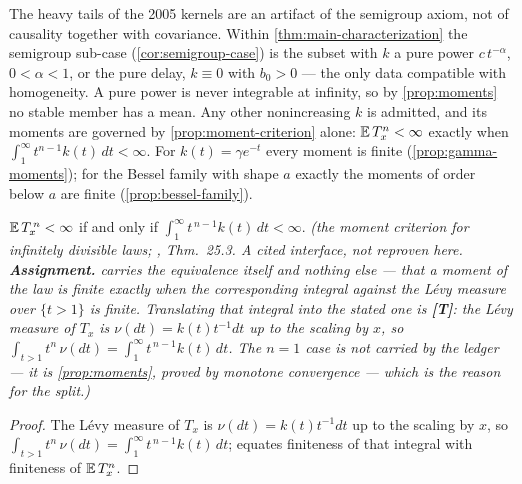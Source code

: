 \begin{remark}\label{rem:heavy-tails}
The heavy tails of the 2005 kernels are an artifact of the semigroup axiom, not of causality
together with covariance. Within \ref{thm:main-characterization} the semigroup sub-case
(\ref{cor:semigroup-case}) is the subset with $k$ a pure power $c\,t^{-\alpha}$,
$0 < \alpha < 1$, or the pure delay, $k \equiv 0$ with $b_0 > 0$ --- the only data compatible
with homogeneity. A pure power is never integrable at infinity, so by
\ref{prop:moments} no stable member has a mean. Any other nonincreasing $k$ is
admitted, and its moments are governed by \ref{prop:moment-criterion} alone:
$\mathbb{E}\,T_x^n < \infty$ exactly when $\int_1^\infty t^{n-1}k(t)\,dt < \infty$. For
$k(t) = \gamma e^{-t}$ every moment is finite (\ref{prop:gamma-moments}); for
the Bessel family with shape $a$ exactly the moments of order below $a$ are finite
(\ref{prop:bessel-family}).
\end{remark}

\begin{proposition}\label{prop:moment-criterion}
$\mathbb{E}\,T_x^{\,n} < \infty$ if and only if $\int_1^\infty t^{\,n-1} k(t)\,dt < \infty$.
\statusA\quad{}\quad\emph{(the moment criterion for infinitely divisible laws;
, Thm.~25.3. A cited interface, not reproven here.
\textbf{Assignment.}  carries the equivalence itself and nothing else --- that a
moment of the law is finite exactly when the corresponding integral against the Lévy measure
over $\{t > 1\}$ is finite. Translating that integral into the stated one is \textbf{[T]}: the
Lévy measure of $T_x$ is $\nu(dt) = k(t)t^{-1}dt$ up to the scaling by $x$, so
$\int_{t>1}t^n\,\nu(dt) = \int_1^\infty t^{\,n-1}k(t)\,dt$. The $n = 1$ case is \emph{not}
carried by the ledger --- it is \ref{prop:moments}, proved by monotone convergence --- which is
the reason for the split.)}
\end{proposition}

\begin{proof}
The Lévy measure of $T_x$ is $\nu(dt) = k(t)t^{-1}dt$ up to the scaling by $x$, so
$\int_{t>1} t^n\,\nu(dt) = \int_1^\infty t^{\,n-1}k(t)\,dt$;  equates finiteness of
that integral with finiteness of $\mathbb{E}\,T_x^n$.
\end{proof}

